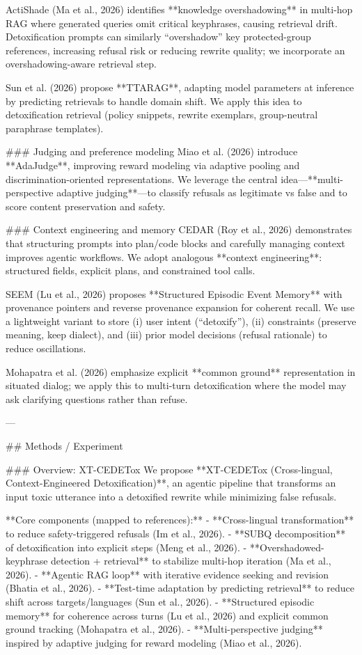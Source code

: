 ActiShade (Ma et al., 2026) identifies **knowledge overshadowing** in multi-hop RAG where generated queries omit critical keyphrases, causing retrieval drift. Detoxification prompts can similarly “overshadow” key protected-group references, increasing refusal risk or reducing rewrite quality; we incorporate an overshadowing-aware retrieval step.

Sun et al. (2026) propose **TTARAG**, adapting model parameters at inference by predicting retrievals to handle domain shift. We apply this idea to detoxification retrieval (policy snippets, rewrite exemplars, group-neutral paraphrase templates).

### Judging and preference modeling  
Miao et al. (2026) introduce **AdaJudge**, improving reward modeling via adaptive pooling and discrimination-oriented representations. We leverage the central idea—**multi-perspective adaptive judging**—to classify refusals as legitimate vs false and to score content preservation and safety.

### Context engineering and memory  
CEDAR (Roy et al., 2026) demonstrates that structuring prompts into plan/code blocks and carefully managing context improves agentic workflows. We adopt analogous **context engineering**: structured fields, explicit plans, and constrained tool calls.

SEEM (Lu et al., 2026) proposes **Structured Episodic Event Memory** with provenance pointers and reverse provenance expansion for coherent recall. We use a lightweight variant to store (i) user intent (“detoxify”), (ii) constraints (preserve meaning, keep dialect), and (iii) prior model decisions (refusal rationale) to reduce oscillations.

Mohapatra et al. (2026) emphasize explicit **common ground** representation in situated dialog; we apply this to multi-turn detoxification where the model may ask clarifying questions rather than refuse.

---

## Methods / Experiment  

### Overview: XT-CEDETox  
We propose **XT-CEDETox (Cross-lingual, Context-Engineered Detoxification)**, an agentic pipeline that transforms an input toxic utterance into a detoxified rewrite while minimizing false refusals.

**Core components (mapped to references):**
- **Cross-lingual transformation** to reduce safety-triggered refusals (Im et al., 2026).
- **SUBQ decomposition** of detoxification into explicit steps (Meng et al., 2026).
- **Overshadowed-keyphrase detection + retrieval** to stabilize multi-hop iteration (Ma et al., 2026).
- **Agentic RAG loop** with iterative evidence seeking and revision (Bhatia et al., 2026).
- **Test-time adaptation by predicting retrieval** to reduce shift across targets/languages (Sun et al., 2026).
- **Structured episodic memory** for coherence across turns (Lu et al., 2026) and explicit common ground tracking (Mohapatra et al., 2026).
- **Multi-perspective judging** inspired by adaptive judging for reward modeling (Miao et al., 2026).

